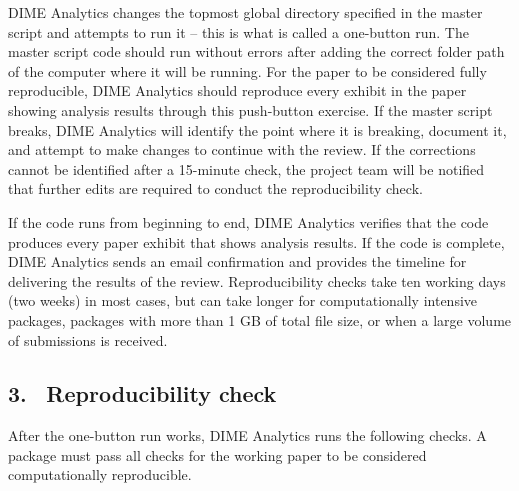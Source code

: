 \begin{fullwidth}
	\bigskip

	DIME Analytics changes the topmost global directory specified in the master script and attempts to run it – this is what is called a one-button run. The master script code should run without errors after adding the correct folder path of the computer where it will be running. For the paper to be considered fully reproducible, DIME Analytics should reproduce every exhibit in the paper showing analysis results through this push-button exercise. If the master script breaks, DIME Analytics will identify the point where it is breaking, document it, and attempt to make changes to continue with the review. If the corrections cannot be identified after a 15-minute check, the project team will be notified that further edits are required to conduct the reproducibility check.

	If the code runs from beginning to end, DIME Analytics verifies that the code produces every paper exhibit that shows analysis results. If the code is complete, DIME Analytics sends an email confirmation and provides the timeline for delivering the results of the review. Reproducibility checks take ten working days (two weeks) in most cases, but can take longer for computationally intensive packages, packages with more than 1 GB of total file size, or when a large volume of submissions is received.

	\subsection{3. \, Reproducibility check}

	After the one-button run works, DIME Analytics runs the following checks. A package must pass all checks for the working paper to be considered computationally reproducible. 

	\bigskip


\end{fullwidth}
